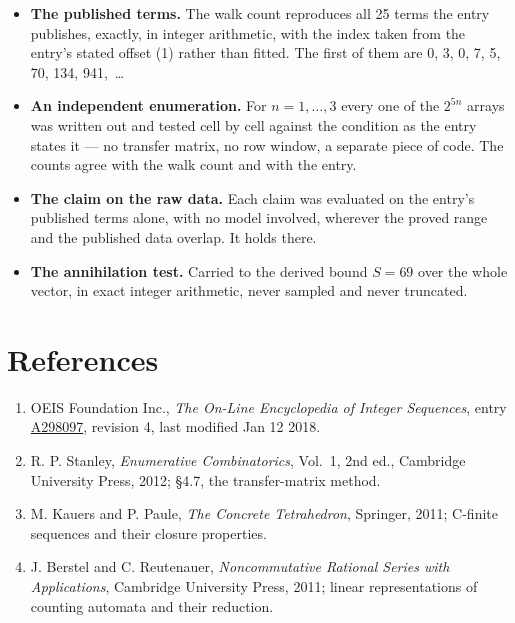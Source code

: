 \documentclass[11pt]{article}
\theoremstyle{definition}
\begin{document}
\begin{itemize}

\item {\bfseries The published terms.} The walk count reproduces all 25 terms the entry publishes, exactly, in integer arithmetic, with the index taken from the entry's stated offset (1) rather than fitted. The first of them are 0, 3, 0, 7, 5, 70, 134, 941,~\dots

\item {\bfseries An independent enumeration.} For $n = 1,\dots,3$ every one of the $2^{5n}$ arrays was written out and tested cell by cell against the condition as the entry states it --- no transfer matrix, no row window, a separate piece of code. The counts agree with the walk count and with the entry.

\item {\bfseries The claim on the raw data.} Each claim was evaluated on the entry's published terms alone, with no model involved, wherever the proved range and the published data overlap. It holds there.

\item {\bfseries The annihilation test.} Carried to the derived bound $S = 69$ over the whole vector, in exact integer arithmetic, never sampled and never truncated.

\end{itemize}

\section{References}

\begin{enumerate}

\item OEIS Foundation Inc., \emph{The On-Line Encyclopedia of Integer Sequences}, entry \href{https://oeis.org/A298097}{A298097}, revision 4, last modified Jan 12 2018.

\item R. P. Stanley, \emph{Enumerative Combinatorics}, Vol.~1, 2nd ed., Cambridge University Press, 2012; \S4.7, the transfer-matrix method.

\item M. Kauers and P. Paule, \emph{The Concrete Tetrahedron}, Springer, 2011; C-finite sequences and their closure properties.

\item J. Berstel and C. Reutenauer, \emph{Noncommutative Rational Series with Applications}, Cambridge University Press, 2011; linear representations of counting automata and their reduction.

\end{enumerate}
\end{document}
